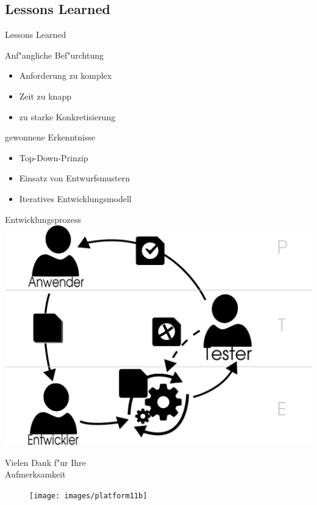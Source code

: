 \subsection{Lessons Learned}
\begin{frame}[<+->]{Lessons Learned}
\begin{block}{Anf"angliche Bef"urchtung}
\begin{itemize}
\item{Anforderung zu komplex}
\item{Zeit zu knapp}
\item{zu starke Konkretisierung}
\end{itemize}
\end{block}
\begin{block}{gewonnene Erkenntnisse}
\begin{itemize}
\item{Top-Down-Prinzip}
\item{Einsatz von Entwurfsmustern}
\item{Iteratives Entwicklungsmodell}
\end{itemize}
\end{block}
\end{frame}

\begin{frame}{Entwicklungsprozess}
\includegraphics[width=\textwidth]{FDD5}
\end{frame}

\begin{frame}{}
\begin{center}
\huge{Vielen Dank f"ur Ihre\\Aufmerksamkeit}\\
\begin{figure}[b!]
\texttt{[image: images/platform11b]}
\end{figure}
\end{center}
\end{frame}



